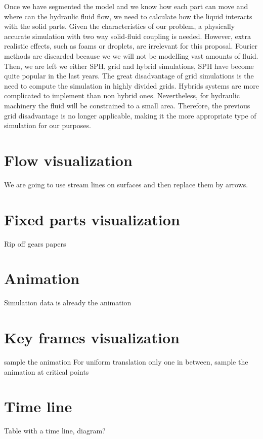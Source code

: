 Once we have segmented the model and we know how each part can move and where can the hydraulic fluid flow, we need to calculate how the liquid interacts with the solid parts.
Given the characteristics of our problem, a physically accurate simulation with two way solid-fluid coupling is needed.
However, extra realistic effects, such as foams or droplets, are irrelevant for this proposal.
Fourier methods are discarded because we we will not be modelling vast amounts of fluid.
Then, we are left we either SPH, grid and hybrid simulations, SPH have become quite popular in the last years.
The great disadvantage of grid simulations is the need to compute the simulation in highly divided grids.
Hybrids systems are more complicated to implement than non hybrid ones.
Nevertheless, for hydraulic machinery the fluid will be constrained to a small area.
Therefore, the previous grid disadvantage is no longer applicable, making it the more appropriate type of simulation for our purposes.


\section{Flow visualization}

We are going to use stream lines on surfaces and then replace them by arrows.

\section{Fixed parts visualization}

Rip off gears papers

\section{Animation}

Simulation data is already the animation

\section{Key frames visualization}

sample the animation
For uniform translation only one in between, sample the animation at critical points

\section{Time line}

Table with a time line, diagram?